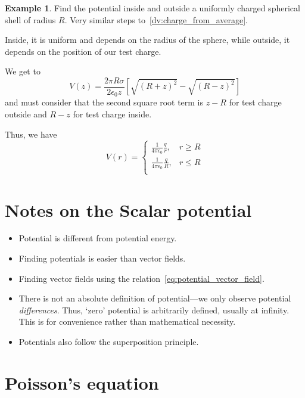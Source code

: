\documentclass[12pt,chapterprefix=false,dvipsnames]{scrbook}
\theoremstyle{dotless}
\theoremstyle{definition}
\newtheorem{protoexample}{Example}[section]
\newenvironment{example}
{\colorlet{shadecolor}{red!15}\begin{shaded}\begin{protoexample}}
			{\end{protoexample}\end{shaded}}
\begin{document}
\begin{example}
	Find the potential inside and outside a uniformly charged
	spherical shell of radius $R$. Very similar
	steps to~\ref{dv:charge_from_average}.

	Inside, it is uniform and depends on the radius of the sphere,
	while outside, it depends on the position of our test charge.

	We get to
	\begin{equation}
		V(z) = \frac{2\pi R\sigma}{2\epsilon_{0}z}\left[\sqrt{{(R+z)}^2} - \sqrt{{(R-z)}^2} \right]
	\end{equation}
	and must consider that the second square root term is
	$z - R$ for test charge outside and
	$R - z$ for test charge inside.

	Thus, we have
	\begin{equation}
		V(r) = \begin{cases}
			\frac{1}{4\pi\epsilon_{0}}\frac{q}{r}, & r \geq R \\
			\frac{1}{4\pi\epsilon_{0}}\frac{q}{R}, & r \leq R \\
		\end{cases}
	\end{equation}
\end{example}

\section{Notes on the Scalar potential}%
\label{sec:notes_on_the_scalar_potential}%

\begin{itemize}
	\item Potential is different from potential energy.
	\item Finding potentials is easier than vector fields.
	\item Finding vector fields using the
	      relation~\ref{eq:potential_vector_field}. \item There is not an absolute definition of potential---we only
	      observe potential \textit{differences}. Thus, `zero'
	      potential is arbitrarily defined, usually at infinity. This is
	      for convenience rather than mathematical necessity. \item Potentials also follow the superposition principle. \end{itemize}

\section{Poisson's equation}%
\label{sec:poisson_s_equation}
\end{document}
